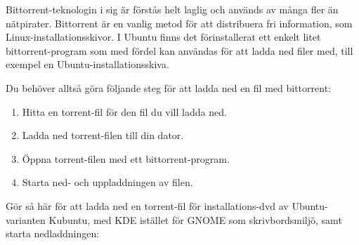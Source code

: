 \documentclass[a4paper,final]{memoir} %
\begin{document}
Bittorrent-teknologin i sig är förstås helt laglig och används av många fler än nätpirater. Bittorrent är en vanlig metod för att distribuera fri information, som Linux-installationsskivor. I Ubuntu finns det förinstallerat ett enkelt litet bittorrent-program som med fördel kan användas för att ladda ned filer med, till exempel en Ubuntu-installationsskiva.



Du behöver alltså göra följande steg för att ladda ned en fil med bittorrent:

\begin{enumerate}
\item Hitta en torrent-fil för den fil du vill ladda ned.
\item Ladda ned torrent-filen till din dator.
\item Öppna torrent-filen med ett bittorrent-program.
\item Starta ned- och uppladdningen av filen.
\end{enumerate}

Gör så här för att ladda ned en torrent-fil för installations-dvd av Ubuntu-varianten Kubuntu, med KDE istället för GNOME som skrivbordsmiljö, samt starta nedladdningen:
\end{document}
